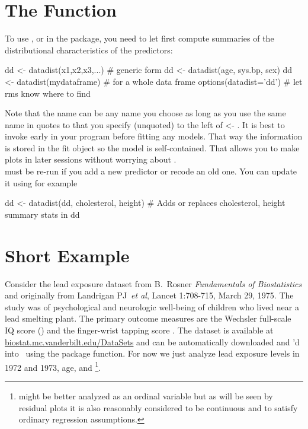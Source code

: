 \section{The   Function}%
\ipacue
To use , or  in the 
  package, you need to let  first compute summaries of the
  distributional characteristics of the predictors:
\begin{Schunk}
\begin{Sinput}
dd <- datadist(x1,x2,x3,...)   # generic form
dd <- datadist(age, sys.bp, sex)
dd <- datadist(mydataframe)    # for a whole data frame
options(datadist='dd')         # let rms know where to find
\end{Sinput}
\end{Schunk}
Note that the name  can be any name you choose as long as you
use the same name in quotes to  that you specify
(unquoted) to the left of <- .  It is best to
invoke  early in your program before fitting any
models.  That way the  information is stored in the fit
  object so the model is self-contained.  That allows you to make
  plots in later sessions without worrying about .  \\
 must be re-run if you add a new predictor or recode an
old one.  You can update it using for example
\begin{Schunk}
\begin{Sinput}
dd <- datadist(dd, cholesterol, height)
# Adds or replaces cholesterol, height summary stats in dd
\end{Sinput}
\end{Schunk}

\section{Short Example}\ipacue{}
Consider the lead exposure dataset from B.\ Rosner \emph{Fundamentals
  of Biostatistics} and originally from Landrigan PJ~\emph{et al}, Lancet
1:708-715, March 29, 1975.  The study was of psychological and
neurologic well-being of children who lived near a lead smelting
plant.  The primary outcome measures are the Wechsler full-scale IQ
score () and the finger-wrist tapping score .  The
dataset is available at \url{biostat.mc.vanderbilt.edu/DataSets}
and can be automatically downloaded and 'd into \R\ using
the  package  function.  For now we just
analyze lead exposure levels in 1972 and 1973, age, and
\footnote{ might be better analyzed as an
  ordinal variable but as will be seen by residual plots it is also
  reasonably considered to be continuous and to satisfy ordinary
  regression assumptions.}.

